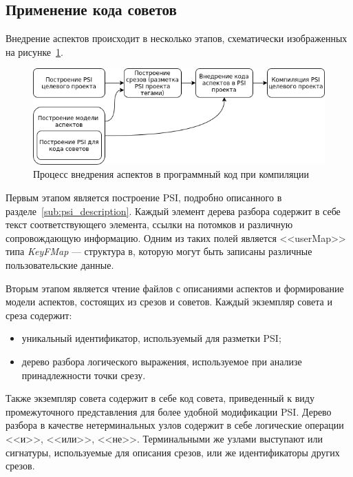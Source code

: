 \subsection{Применение кода советов}
\label{ssec:advice_applying_description}
Внедрение аспектов происходит в несколько этапов, схематически изображенных на
рисунке~\ref{fig:aspect_weaving}.
\begin{figure}[!t]
\centering
\includegraphics[width=1\textwidth]{fig/aspect_weaving}
\caption{Процесс внедрения аспектов в программный код при компиляции}
\label{fig:aspect_weaving}
\end{figure}

Первым этапом является построение PSI, подробно описанного в разделе~\ref{sub:psi_description}.
Каждый элемент дерева разбора содержит в себе текст соответствующего элемента,
ссылки на потомков и различную сопровождающую информацию.
Одним из таких полей является <<userMap>> типа \textit{KeyFMap} --- структура в,
которую могут быть записаны различные пользовательские данные.

Вторым этапом является чтение файлов с описаниями аспектов и формирование
модели аспектов, состоящих из срезов и советов.
Каждый экземпляр совета и среза содержит:
\begin{itemize}
	\item уникальный идентификатор, используемый для разметки PSI;
	\item дерево разбора логического выражения, используемое при анализе
		  принадлежности точки срезу.
\end{itemize}
Также экземпляр совета содержит в себе код совета, приведенный к виду
промежуточного представления для более удобной модификации PSI.
Дерево разбора в качестве нетерминальных узлов содержит в себе логические
операции <<и>>, <<или>>, <<не>>.
Терминальными же узлами выступают или сигнатуры, используемые для описания
срезов, или же идентификаторы других срезов.

